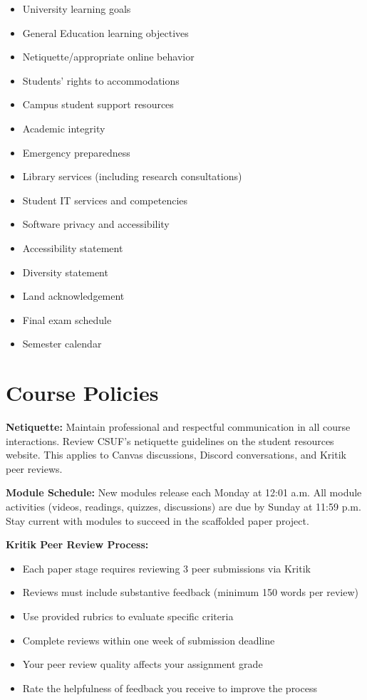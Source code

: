 \documentclass[12pt]{article}     %
\begin{document}
\begin{itemize}
\item University learning goals
\item General Education learning objectives
\item Netiquette/appropriate online behavior
\item Students' rights to accommodations
\item Campus student support resources
\item Academic integrity
\item Emergency preparedness
\item Library services (including research consultations)
\item Student IT services and competencies
\item Software privacy and accessibility
\item Accessibility statement
\item Diversity statement
\item Land acknowledgement
\item Final exam schedule
\item Semester calendar
\end{itemize}

\section{Course Policies}

\noindent \textbf{Netiquette:} Maintain professional and respectful communication in all course interactions. Review CSUF's netiquette guidelines on the student resources website. This applies to Canvas discussions, Discord conversations, and Kritik peer reviews.

\vspace{0.5em}
\noindent \textbf{Module Schedule:} New modules release each Monday at 12:01 a.m. All module activities (videos, readings, quizzes, discussions) are due by Sunday at 11:59 p.m. Stay current with modules to succeed in the scaffolded paper project.

\vspace{0.5em}
\noindent \textbf{Kritik Peer Review Process:} 
\begin{itemize}
\item Each paper stage requires reviewing 3 peer submissions via Kritik
\item Reviews must include substantive feedback (minimum 150 words per review)
\item Use provided rubrics to evaluate specific criteria
\item Complete reviews within one week of submission deadline
\item Your peer review quality affects your assignment grade
\item Rate the helpfulness of feedback you receive to improve the process
\end{itemize}
\end{document}
